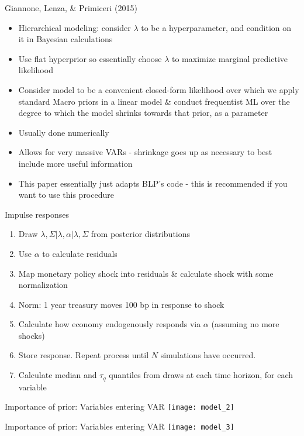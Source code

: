 \documentclass{beamer}
\begin{document}
\begin{frame}{Giannone, Lenza, \& Primiceri (2015)}
\begin{itemize}
\item Hierarchical modeling: consider $\lambda$ to be a hyperparameter, and condition on it in Bayesian calculations
\item Use flat hyperprior so essentially choose $\lambda$ to maximize marginal predictive likelihood 
\item Consider model to be a convenient closed-form likelihood over which we apply standard Macro priors in a linear model \& conduct frequentist ML over the degree to which the model shrinks towards that prior, as a parameter
\item Usually done numerically
\item Allows for very massive VARs - shrinkage goes up as necessary to best include more useful information
\item This paper essentially just adapts BLP's code - this is recommended if you want to use this procedure
\end{itemize}
\end{frame}

\begin{frame}{Impulse responses}
\begin{enumerate}
\item Draw $\lambda,\Sigma|\lambda, \alpha|\lambda,\Sigma$ from posterior distributions
\item Use $\alpha$ to calculate residuals
\item Map monetary policy shock into residuals \& calculate shock with some normalization
\item Norm: 1 year treasury moves 100 bp in response to shock
\item Calculate how economy endogenously responds via $\alpha$ (assuming no more shocks)
\item Store response. Repeat process until $N$ simulations have occurred.
\item Calculate median and $\tau_q$ quantiles from draws at each time horizon, for each variable
\end{enumerate}
\end{frame}

\begin{frame}{Importance of prior: Variables entering VAR}
\texttt{[image: model\_2]}
\end{frame}

\begin{frame}{Importance of prior: Variables entering VAR}
\texttt{[image: model\_3]}
\end{frame}
\end{document}
